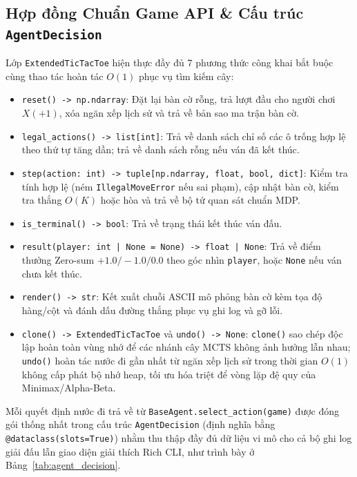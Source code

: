 \documentclass[a4paper,12pt]{report}
\begin{document}
\subsection{Hợp đồng Chuẩn Game API \& Cấu trúc \texttt{AgentDecision}}
Lớp \texttt{ExtendedTicTacToe} hiện thực đầy đủ 7 phương thức công khai bắt buộc cùng thao tác hoàn tác $O(1)$ phục vụ tìm kiếm cây:
\begin{itemize}[leftmargin=1.2cm]
    \item \texttt{reset() -> np.ndarray}: Đặt lại bàn cờ rỗng, trả lượt đầu cho người chơi $X (+1)$, xóa ngăn xếp lịch sử và trả về bản sao ma trận bàn cờ.
    \item \texttt{legal\_\allowbreak actions() -> list[int]}: Trả về danh sách chỉ số các ô trống hợp lệ theo thứ tự tăng dần; trả về danh sách rỗng nếu ván đã kết thúc.
    \item \texttt{step(action: int) -> tuple[np.ndarray, float, bool, dict]}: Kiểm tra tính hợp lệ (ném \texttt{IllegalMoveError} nếu sai phạm), cập nhật bàn cờ, kiểm tra thắng $O(K)$ hoặc hòa và trả về bộ tứ quan sát chuẩn MDP.
    \item \texttt{is\_\allowbreak terminal() -> bool}: Trả về trạng thái kết thúc ván đấu.
    \item \texttt{result(player: int | None = None) -> float | None}: Trả về điểm thưởng Zero-sum $+1.0 / -1.0 / 0.0$ theo góc nhìn \texttt{player}, hoặc \texttt{None} nếu ván chưa kết thúc.
    \item \texttt{render() -> str}: Kết xuất chuỗi ASCII mô phỏng bàn cờ kèm tọa độ hàng/cột và đánh dấu đường thắng phục vụ ghi log và gỡ lỗi.
    \item \texttt{clone() -> ExtendedTicTacToe} và \texttt{undo() -> None}: \texttt{clone()} sao chép độc lập hoàn toàn vùng nhớ để các nhánh cây MCTS không ảnh hưởng lẫn nhau; \texttt{undo()} hoàn tác nước đi gần nhất từ ngăn xếp lịch sử trong thời gian $O(1)$ không cấp phát bộ nhớ heap, tối ưu hóa triệt để vòng lặp đệ quy của Minimax/Alpha-Beta.
\end{itemize}

Mỗi quyết định nước đi trả về từ \texttt{BaseAgent.select\_\allowbreak action(game)} được đóng gói thống nhất trong cấu trúc \texttt{AgentDecision} (định nghĩa bằng \texttt{@dataclass(\allowbreak slots=True)}) nhằm thu thập đầy đủ dữ liệu vi mô cho cả bộ ghi log giải đấu lẫn giao diện giải thích Rich CLI, như trình bày ở Bảng~\ref{tab:agent_decision}.
\end{document}
